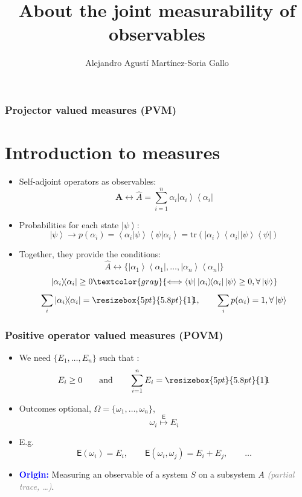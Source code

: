 \documentclass[mathserif,handout]{beamer}
\author{Alejandro Agust\'{i} Mart\'{i}nez-Soria Gallo}
\title{About the joint measurability of observables}
\newcommand{\ket}[1]{\left| #1\right\rangle}
\newcommand{\bra}[1]{\left\langle #1\right|}
\newcommand{\projector}[1]{\ket{#1}\!\!\bra{#1}}
\newcommand{\braket}[2]{\left \langle #1 \right|\left.\! #2\right\rangle}
\newcommand{\tr}{\mathrm{tr}}
\newcommand{\kpsi}{\ket{\psi}}
\newcommand{\ppsi}{\projector{\psi}}
\newcommand{\bbone}{\ensuremath{\resizebox{5pt}{5.8pt}{1}\hspace{-3.5pt}1}}
\begin{document}
\begin{frame}
\maketitle
\end{frame}


\begin{frame}
\tableofcontents


\end{frame}


\begin{frame}
\frametitle{Projector valued measures (PVM)}
\section{Introduction to measures}


\begin{itemize}
\item<1-> Self-adjoint operators as observables:
$$\mathbf{A} \longleftrightarrow \hat{A} = \sum_{i=1}^{n} \alpha_{i}\projector{\alpha_{i}}$$
\item<2-> Probabilities for each state $\kpsi$:
$$\kpsi \longrightarrow p(\alpha_{i}) =  \braket{\alpha_{i}}{\psi}\braket{\psi}{\alpha_{i}} = \tr \left (\projector{\alpha_{i}}\ppsi\right )$$
\item<3-> Together, they provide the conditions:
$$
\hat{A} \longleftrightarrow  \{ \projector{\alpha_{1}} ,\ldots , \projector{\alpha_{n}}  \} 
$$
$$
\projector{\alpha_{i}} \geq 0 
\textcolor{gray}{\Longleftrightarrow \bra{\psi} \projector{\alpha_{i}}\kpsi \geq 0, \forall \kpsi}
$$
$$
\sum_{i}\projector{\alpha_{i}}  = \bbone, \qquad \sum_{i}p(\alpha_{i} ) = 1, \forall \kpsi
$$
\end{itemize}
\end{frame}


\begin{frame}
\frametitle{Positive operator valued measures (POVM)}

\begin{itemize}
\item We need $\{E_{1}, \ldots , E_{n}\}$ such that :
$$
E_{i}\geq 0\qquad\mbox{and}\qquad \sum_{i=1}^{n}E_{i} =\bbone
$$
\item Outcomes optional, $\Omega = \{\omega_{1}, \ldots , \omega_{n}\}$, 
$$
\omega_{i} \overset{\mathsf{E}}{\longmapsto} E_{i}
$$
\item E.g.    
$$
\mathsf{E}(\omega_{i}) = E_{i}, \qquad \mathsf{E}(\omega_{i}, \omega_{j}) = E_{i} + E_{j} , \qquad
\ldots
$$
\item \textcolor{blue}{\bf Origin:} Measuring an observable of a system $S$ on a subsystem $A$ \textcolor{gray}{\it (partial trace, \ldots )}. 
\end{itemize}
\end{frame}
\end{document}
